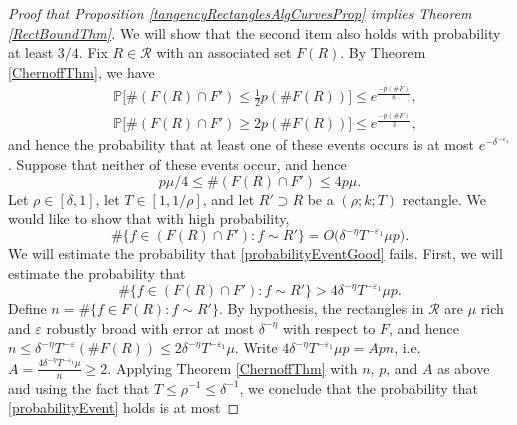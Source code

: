 \documentclass[letterpaper, reqno,11pt]{article}
\numberwithin{equation}{section}
\newcommand{\eps}{\varepsilon}
\numberwithin{thm}{section}
\theoremstyle{remark}
\begin{document}
\begin{proof}[Proof that Proposition \ref{tangencyRectanglesAlgCurvesProp} implies Theorem \ref{RectBoundThm}]
We will show that the second item also holds with probability at least $3/4$. Fix $R\in\mathcal{R}$ with an associated set $F(R)$. By Theorem \ref{ChernoffThm}, we have
\begin{align*}
&\mathbb{P}\Big[\#(F(R)\cap F')\leq \frac{1}{2}p(\#F(R)) \Big]\leq e^{\frac{-p(\#F)}{8}},\\
&\mathbb{P}\Big[\#(F(R)\cap F')\geq 2p(\#F(R)) \Big]\leq e^{\frac{-p(\#F)}{3}},
\end{align*}
and hence the probability that at least one of these events occurs is at most $e^{-\delta^{-\eps_1}}$. Suppose that neither of these events occur, and hence
\[
p\mu/4 \leq \#(F(R)\cap F') \leq 4p\mu. 
\]
Let $\rho\in[\delta,1]$, let $T\in[1,1/\rho]$, and let $R'\supset R$ be a $(\rho; k; T)$ rectangle. We would like to show that with high probability,
\begin{equation}\label{probabilityEventGood}
\# \{f\in (F(R)\cap F')\colon f\sim R'\}= O\big(\delta^{-\eta} T^{-\eps_1} \mu p\big).
\end{equation}
We will estimate the probability that \eqref{probabilityEventGood} fails. First, we will estimate the probability that
\begin{equation}\label{probabilityEvent}
\# \{f\in (F(R)\cap F')\colon f\sim R'\} > 4\delta^{-\eta} T^{-\eps_1} \mu p.
\end{equation}
Define $n= \#\{f\in F(R)\colon f\sim R'\}$. By hypothesis, the rectangles in $\mathcal{R}$ are $\mu$ rich and $\eps$ robustly broad with error at most $\delta^{-\eta}$ with respect to $F$, and hence $n\leq \delta^{-\eta}T^{-\eps}(\# F(R))\leq 2\delta^{-\eta} T^{-\eps_1}\mu$. Write $4\delta^{-\eta}T^{-\eps_1}\mu p = Apn$, i.e.~$A=\frac{4\delta^{-\eta}T^{-\eps_1}\mu}{n}\geq 2$. Applying Theorem \ref{ChernoffThm} with $n$, $p$, and $A$ as above and using the fact that $T\leq \rho^{-1}\leq\delta^{-1}$, we conclude that the probability that \eqref{probabilityEvent} holds is at most 


\end{proof}
\end{document}
